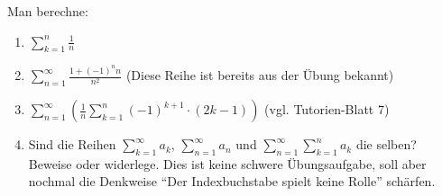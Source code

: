 \begin{exercise}
    Man berechne:
  \begin{enumerate}[label=(\alph*)]
  \item $\displaystyle \sum_{k=1}^n\frac{1}{n}$
  \item $\displaystyle \sum_{n=1}^\infty \frac{1 + (-1)^n n}{n^2}$ (Diese Reihe
    ist bereits aus der Übung bekannt)
  \item
    $\displaystyle \sum_{n = 1}^\infty \left( \frac{1}{n} \sum_{k = 1}^n
      (-1)^{k+1} \cdot (2k-1) \right)$ (vgl. Tutorien-Blatt 7)
  \item Sind die Reihen $\displaystyle \sum_{k=1}^{\infty} a_k$,
    $\displaystyle \sum_{n=1}^{\infty} a_n$ und
    $\displaystyle \sum_{n=1}^{\infty}\sum_{k=1}^{n} a_k$ die selben? Beweise
    oder widerlege. Dies ist keine schwere Übungsaufgabe, soll aber nochmal die
    Denkweise \enquote{Der Indexbuchstabe spielt keine Rolle} schärfen.
  \end{enumerate}
\end{exercise}


